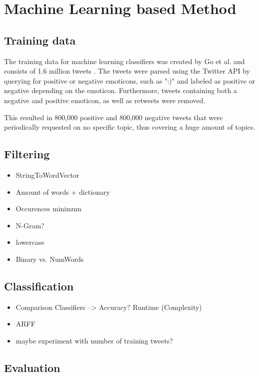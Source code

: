 \section{Machine Learning based Method}

\subsection{Training data}
The training data for machine learning classifiers was created by Go et al. and consists of 1.6 million tweets \cite{GoBHaHua2009}. The tweets were parsed using the Twitter API by querying for positive or negative emoticons, such as ":)" and labeled as positive or negative depending on the emoticon. Furthermore, tweets containing both a negative and positive emoticon, as well as retweets were removed.

This resulted in 800,000 positive and 800,000 negative tweets that were periodically requested on no specific topic, thus covering a huge amount of topics.


\subsection{Filtering}
\begin{itemize}
    \item StringToWordVector
    \item Amount of words + dictionary
    \item Occurences minimum
    \item N-Gram?
    \item lowercase
    \item Binary vs. NumWords
\end{itemize}
\subsection{Classification}
\begin{itemize}
    \item Comparison Classifiers --> Accuracy? Runtime (Complexity)
    \item ARFF
    \item maybe experiment with number of training tweets?
\end{itemize}
\subsection{Evaluation}

